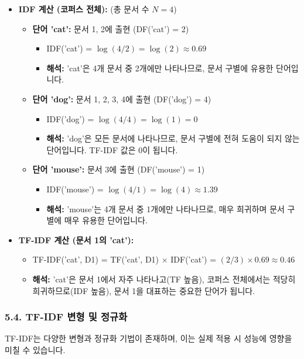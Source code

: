 \documentclass[11pt,a4paper]{article}
\begin{document}
\begin{itemize}
    \item \textbf{IDF 계산 (코퍼스 전체):} (총 문서 수 $N=4$)
    \begin{itemize}
        \item \textbf{단어 'cat':} 문서 1, 2에 출현 (DF('cat') = 2)
            \begin{itemize}
                \item IDF('cat') = $\log(4/2) = \log(2) \approx 0.69$
                \item \textbf{해석:} 'cat'은 4개 문서 중 2개에만 나타나므로, 문서 구별에 유용한 단어입니다.
            \end{itemize}
        \item \textbf{단어 'dog':} 문서 1, 2, 3, 4에 출현 (DF('dog') = 4)
            \begin{itemize}
                \item IDF('dog') = $\log(4/4) = \log(1) = 0$
                \item \textbf{해석:} 'dog'은 모든 문서에 나타나므로, 문서 구별에 전혀 도움이 되지 않는 단어입니다. TF-IDF 값은 0이 됩니다.
            \end{itemize}
        \item \textbf{단어 'mouse':} 문서 3에 출현 (DF('mouse') = 1)
            \begin{itemize}
                \item IDF('mouse') = $\log(4/1) = \log(4) \approx 1.39$
                \item \textbf{해석:} 'mouse'는 4개 문서 중 1개에만 나타나므로, 매우 희귀하며 문서 구별에 매우 유용한 단어입니다.
            \end{itemize}
    \end{itemize}

    \item \textbf{TF-IDF 계산 (문서 1의 'cat'):}
    \begin{itemize}
        \item TF-IDF('cat', D1) = TF('cat', D1) $\times$ IDF('cat') = $(2/3) \times 0.69 \approx 0.46$
        \item \textbf{해석:} 'cat'은 문서 1에서 자주 나타나고(TF 높음), 코퍼스 전체에서는 적당히 희귀하므로(IDF 높음), 문서 1을 대표하는 중요한 단어가 됩니다.
    \end{itemize}
\end{itemize}

\subsubsection*{5.4. TF-IDF 변형 및 정규화}
TF-IDF는 다양한 변형과 정규화 기법이 존재하며, 이는 실제 적용 시 성능에 영향을 미칠 수 있습니다.
\end{document}

